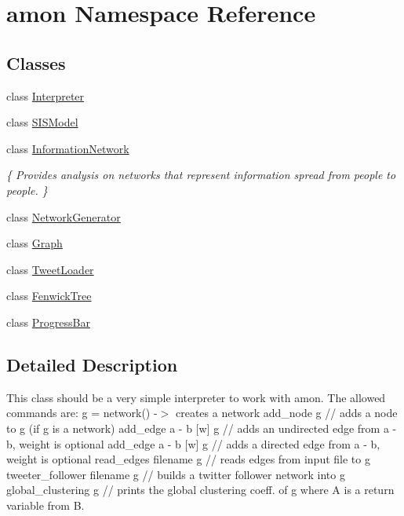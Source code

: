 \hypertarget{namespaceamon}{\section{amon Namespace Reference}
\label{namespaceamon}
}
\subsection*{Classes}
\begin{DoxyCompactItemize}
\item 
class \hyperlink{classamon_1_1_interpreter}{Interpreter}
\item 
class \hyperlink{classamon_1_1_s_i_s_model}{S\-I\-S\-Model}
\item 
class \hyperlink{classamon_1_1_information_network}{Information\-Network}
\begin{DoxyCompactList}\small\item\em \{ Provides analysis on networks that represent information spread from people to people. \} \end{DoxyCompactList}\item 
class \hyperlink{classamon_1_1_network_generator}{Network\-Generator}
\item 
class \hyperlink{classamon_1_1_graph}{Graph}
\item 
class \hyperlink{classamon_1_1_tweet_loader}{Tweet\-Loader}
\item 
class \hyperlink{classamon_1_1_fenwick_tree}{Fenwick\-Tree}
\item 
class \hyperlink{classamon_1_1_progress_bar}{Progress\-Bar}
\end{DoxyCompactItemize}


\subsection{Detailed Description}
This class should be a very simple interpreter to work with amon. The allowed commands are\-: g = network() -\/$>$ creates a network add\-\_\-node g // adds a node to g (if g is a network) add\-\_\-edge a -\/ b \mbox{[}w\mbox{]} g // adds an undirected edge from a -\/ b, weight is optional add\-\_\-edge a -\/ b \mbox{[}w\mbox{]} g // adds a directed edge from a -\/ b, weight is optional read\-\_\-edges filename g // reads edges from input file to g tweeter\-\_\-follower filename g // builds a twitter follower network into g global\-\_\-clustering g // prints the global clustering coeff. of g where A is a return variable from B. 